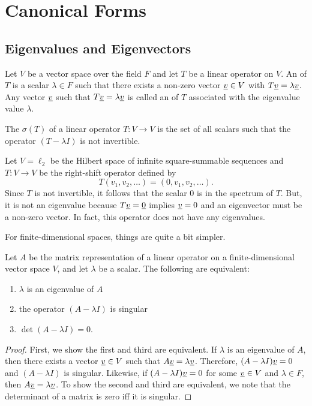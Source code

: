 \chapter{Canonical Forms}

\section{Eigenvalues and Eigenvectors}

\begin{definition}
Let $V$ be a vector space over the field $F$ and let $T$ be a linear operator on $V$.
An  of $T$ is a scalar $\lambda \in F$ such that there exists a non-zero vector $\underline{v} \in V$ with $T \underline{v} = \lambda \underline{v}$.
Any vector $\underline{v}$ such that $T \underline{v} = \lambda \underline{v}$ is called an  of $T$ associated with the eigenvalue value $\lambda$.
\end{definition}

\begin{definition}
The  $\sigma(T)$ of a linear operator $T: V \rightarrow V$ is the set of all scalars such that the operator $(T-\lambda I)$ is not invertible.
\end{definition}

\begin{example}
Let $V=\ell_2$ be the Hilbert space of infinite square-summable sequences and $T:V\rightarrow V$ be the right-shift operator defined by
\[ T (v_1,v_2,\ldots) = (0,v_1,v_2,\ldots). \]
Since $T$ is not invertible, it follows that the scalar $0$ is in the spectrum of $T$.
But, it is not an eigenvalue because $T \underline{v} = \underline{0}$ implies $\underline{v} = 0$ and an eigenvector must be a non-zero vector.
In fact, this operator does not have any eigenvalues.
\end{example}

For finite-dimensional spaces, things are quite a bit simpler.

\begin{theorem}
Let $A$ be the matrix representation of a linear operator on a finite-dimensional vector space $V$, and let $\lambda$ be a scalar.
The following are equivalent:
\begin{enumerate}
\item $\lambda$ is an eigenvalue of $A$
\item the operator $(A - \lambda I)$ is singular
\item $\det (A - \lambda I) = 0$.
\end{enumerate}
\end{theorem}
\begin{proof}
First, we show the first and third are equivalent.
If $\lambda$ is an eigenvalue of $A$, then there exists a vector $\underline{v} \in V$ such that $A \underline{v} = \lambda \underline{v}$.
Therefore, $(A-\lambda I)\underline{v} = 0$ and $(A - \lambda I)$ is singular.
Likewise, if $(A-\lambda I)\underline{v} = 0$ for some $\underline{v} \in V$ and $\lambda \in F$, then $A \underline{v} = \lambda \underline{v}$.
To show the second and third are equivalent, we note that the determinant of a matrix is zero iff it is singular.
\end{proof}


